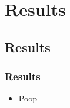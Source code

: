 \section{Results}

\subsection{Results}

\begin{frame}
    \frametitle{Results}
    \begin{itemize}
        \item Poop
    \end{itemize}
\end{frame}
